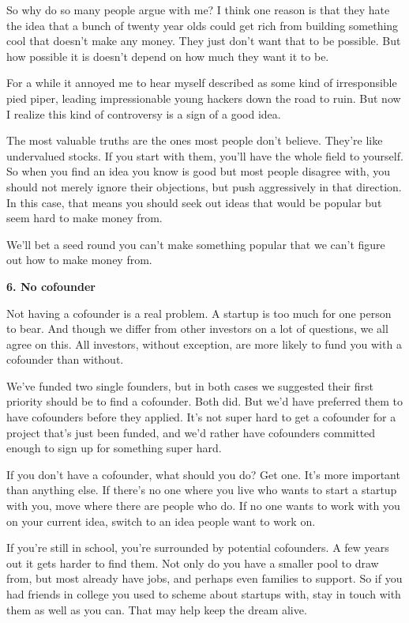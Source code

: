 \documentclass[12pt]{book}
\begin{document}
So why do so many people argue with me? I think one reason is that they
hate the idea that a bunch of twenty year olds could get rich from
building something cool that doesn't make any money. They just don't
want that to be possible. But how possible it is doesn't depend on how
much they want it to be.

For a while it annoyed me to hear myself described as some kind of
irresponsible pied piper, leading impressionable young hackers down the
road to ruin. But now I realize this kind of controversy is a sign of a
good idea.

The most valuable truths are the ones most people don't believe. They're
like undervalued stocks. If you start with them, you'll have the whole
field to yourself. So when you find an idea you know is good but most
people disagree with, you should not merely ignore their objections, but
push aggressively in that direction. In this case, that means you should
seek out ideas that would be popular but seem hard to make money from.

We'll bet a seed round you can't make something popular that we can't
figure out how to make money from.

\textbf{6. No cofounder}

Not having a cofounder is a real problem. A startup is too much for one
person to bear. And though we differ from other investors on a lot of
questions, we all agree on this. All investors, without exception, are
more likely to fund you with a cofounder than without.

We've funded two single founders, but in both cases we suggested their
first priority should be to find a cofounder. Both did. But we'd have
preferred them to have cofounders before they applied. It's not super
hard to get a cofounder for a project that's just been funded, and we'd
rather have cofounders committed enough to sign up for something super
hard.

If you don't have a cofounder, what should you do? Get one. It's more
important than anything else. If there's no one where you live who wants
to start a startup with you, move where there are people who do. If no
one wants to work with you on your current idea, switch to an idea
people want to work on.

If you're still in school, you're surrounded by potential cofounders. A
few years out it gets harder to find them. Not only do you have a
smaller pool to draw from, but most already have jobs, and perhaps even
families to support. So if you had friends in college you used to scheme
about startups with, stay in touch with them as well as you can. That
may help keep the dream alive.
\end{document}
